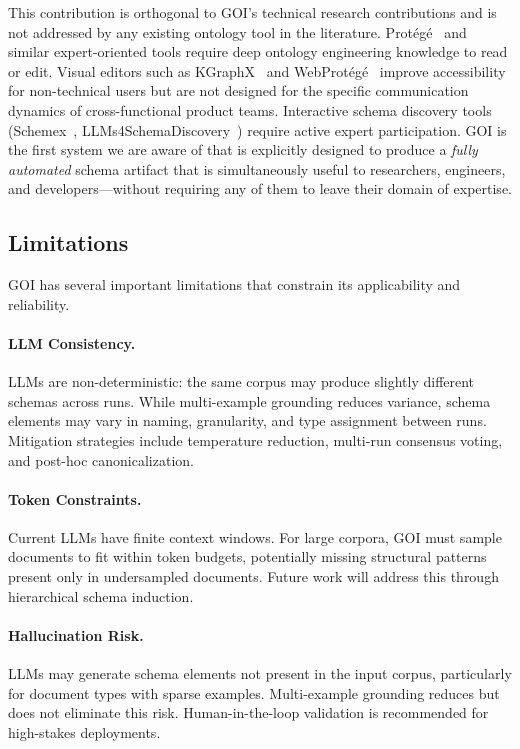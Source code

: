 \documentclass[runningheads,a4paper]{llncs}
\begin{document}
This contribution is orthogonal to GOI's technical research
contributions and is not addressed by any existing ontology tool in the
literature. Prot\'eg\'e~\cite{musen2015protege} and similar expert-oriented
tools require deep ontology engineering knowledge to read or edit.
Visual editors such as KGraphX~\cite{rodriguez2023kgraphx} and
WebProt\'eg\'e~\cite{patel2023ontospread} improve accessibility for
non-technical users but are not designed for the specific communication
dynamics of cross-functional product teams. Interactive schema discovery
tools (Schemex~\cite{davis2024schemex}, LLMs4SchemaDiscovery~\cite{sadruddin2025})
require active expert participation. GOI is the first system we are
aware of that is explicitly designed to produce a \emph{fully automated}
schema artifact that is simultaneously useful to researchers, engineers,
and developers---without requiring any of them to leave their domain of
expertise.

\subsection{Limitations}

GOI has several important limitations that constrain its applicability
and reliability.

\paragraph{LLM Consistency.} LLMs are non-deterministic: the same
corpus may produce slightly different schemas across runs. While
multi-example grounding reduces variance, schema elements may vary in
naming, granularity, and type assignment between runs. Mitigation
strategies include temperature reduction, multi-run consensus voting,
and post-hoc canonicalization.

\paragraph{Token Constraints.} Current LLMs have finite context windows.
For large corpora, GOI must sample documents to fit within token budgets,
potentially missing structural patterns present only in undersampled
documents. Future work will address this through hierarchical schema
induction.

\paragraph{Hallucination Risk.} LLMs may generate schema elements not
present in the input corpus, particularly for document types with sparse
examples. Multi-example grounding reduces but does not eliminate this
risk. Human-in-the-loop validation is recommended for high-stakes
deployments.
\end{document}
